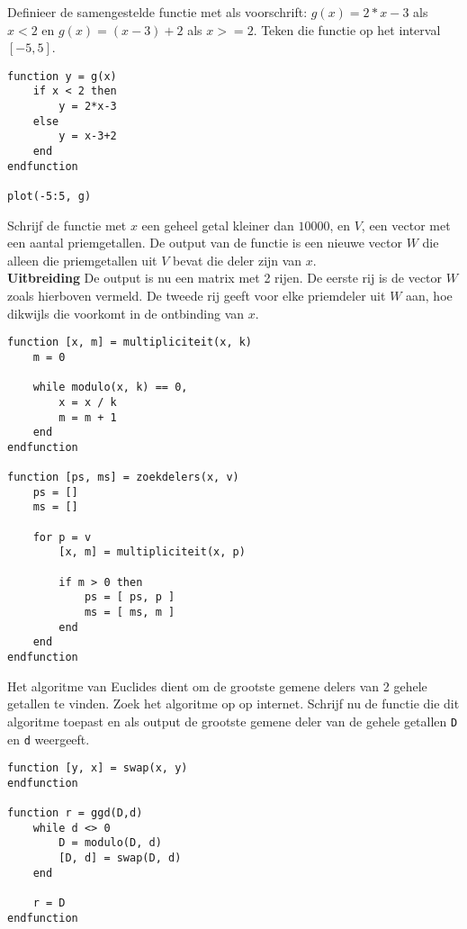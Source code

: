 \begin{oef}
Definieer de samengestelde functie  met
    als voorschrift:
$g(x)=2*x-3$ als $x<2$ en $g(x)=(x-3)+2$ als $x>=2$. 
Teken die functie op het
interval $[-5,5]$.
\begin{opl}
\begin{lstlisting}
function y = g(x)
    if x < 2 then
        y = 2*x-3
    else
        y = x-3+2
    end
endfunction

plot(-5:5, g)
\end{lstlisting}
\end{opl}
\end{oef}

\begin{oef}
Schrijf de functie  met $x$ een 
geheel getal kleiner dan  $10000$, en $V$, een vector met een 
aantal priemgetallen. De output van de functie is een nieuwe 
vector $W$ die alleen die priemgetallen uit $V$ bevat die deler 
zijn van $x$.\\
\textbf{Uitbreiding} De output is nu een matrix met 2 rijen. De 
eerste rij is de vector $W$ zoals hierboven vermeld. De tweede 
rij geeft voor elke priemdeler uit $W$ aan, hoe dikwijls die voorkomt in 
de ontbinding van $x$.
\begin{opl}
\begin{lstlisting}
function [x, m] = multipliciteit(x, k)
    m = 0
    
    while modulo(x, k) == 0,
        x = x / k
        m = m + 1
    end
endfunction

function [ps, ms] = zoekdelers(x, v)
    ps = []
    ms = []    
    
    for p = v
        [x, m] = multipliciteit(x, p)
        
        if m > 0 then
            ps = [ ps, p ]
            ms = [ ms, m ]
        end
    end
endfunction
\end{lstlisting}
\end{opl}
\end{oef}


\begin{oef}
Het algoritme van Euclides dient  om de grootste gemene delers van 2 gehele getallen
te vinden. Zoek het algoritme op op internet. Schrijf nu de functie 
 die dit algoritme toepast en als output de grootste gemene deler van de gehele getallen \verb+D+ en \verb+d+ weergeeft.

\begin{opl}
\begin{lstlisting}
function [y, x] = swap(x, y)
endfunction

function r = ggd(D,d)
    while d <> 0
        D = modulo(D, d)
        [D, d] = swap(D, d)
    end
    
    r = D
endfunction
\end{lstlisting}
\end{opl}
\end{oef}

